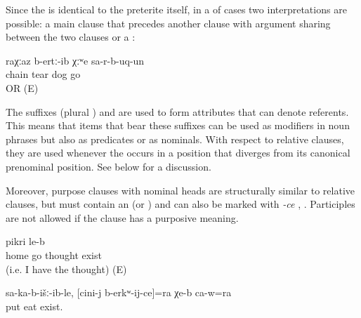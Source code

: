 Since the  is identical to the preterite itself, in a  of cases two interpretations are possible: a main clause that precedes another clause with argument sharing between the two clauses or a :

\begin{exe}
	\ex	
	\gll	raχːaz	b-ertː-ib	χːʷe	sa-r-b-uq-un\\
		chain	tear	dog	go\\
	\glt	{} OR  (E)
\end{exe}

The suffixes  (plural ) and  are used to form attributes that can denote referents. This means that items that bear these suffixes can be used as modifiers in noun phrases but also as predicates or as nominals. With respect to relative clauses, they are used whenever the  occurs in a position that diverges from its canonical prenominal position. See  below for a discussion.

Moreover, purpose clauses with nominal heads are structurally similar to relative clauses, but must contain an  (or ) and can also be marked with \textit{-ce} , . Participles are not allowed if the clause has a purposive meaning.

\begin{exe}
	\ex	\label{ex:There is the thought (i.e. I have the thought) to go home}
	\gll	[du	qili	uq'-ij]	pikri	le-b\\
			home	go	thought	exist \\
	\glt	{} (i.e. I have the thought) (E)

	\ex	\label{ex:‎He is also there (something) to eat that has been placed in front of him for him}
	\gll	sa-ka-b-išː-ib-le,	[cini-j	b-erkʷ-ij-ce]=ra	χe-b	ca-w=ra\\
		put		eat	exist.	\\
	\glt	{}
\end{exe}

